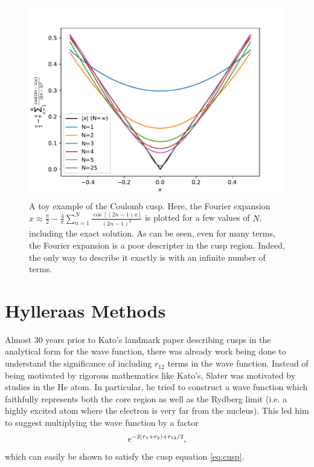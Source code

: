 \begin{figure}[htbp]
    \centering
    \includegraphics{figures/explicit/cusp.pdf}
    \caption{A toy example of the Coulomb cusp. Here, the Fourier expansion $x\approx\frac{\pi}{2} - \frac {4}{\pi} \sum_{n=1}^N\frac{\cos[(2n-1)x]}{(2n-1)^2}$ is plotted for a few values of $N$, including the exact solution. As can be seen, even for many terms, the Fourier expansion is a poor descripter in the cusp region. Indeed, the only way to describe it exactly is with an infinite number of terms.}
    \label{fig:cusp}
\end{figure}

\section{Hylleraas Methods}

Almost 30 years prior to Kato's landmark paper describing cusps in the analytical form for the wave function, there was already work being done to understand the significance of including $r_{12}$ terms in the wave function. Instead of being motivated by rigorous mathematics like Kato's, Slater was motivated by studies in the He atom. In particular, he tried to construct a wave function which faithfully represents both the core region as well as the Rydberg limit (i.e. a highly excited atom where the electron is very far from the nucleus).\cite{kongExplicitly2012,grynbergIntroduction2010,slaterCentral1928,slaterNormal1928} This led him to suggest multiplying the wave function by a factor
\begin{equation}
    \mathrm{e}^{-2(r_1+r_2)+r_{12}/2},
\end{equation}
which can easily be shown to satisfy the cusp equation \eqref{eq:cusp}.

